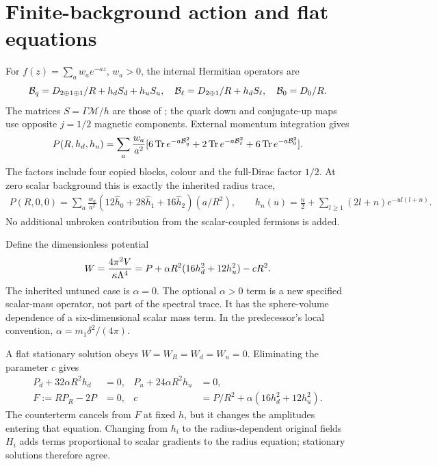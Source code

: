 \documentclass[11pt,letterpaper]{article}
\DeclareMathOperator{\Tr}{Tr}\DeclareMathOperator{\diag}{diag}
\begin{document}
\section{Finite-background action and flat equations}

For $f(z)=\sum_a w_a e^{-az}$, $w_a>0$, the internal Hermitian operators are
\begin{equation}
 \mathcal B_q=D_{2\oplus1\oplus1}/R+h_dS_d+h_uS_u,\quad
 \mathcal B_\ell=D_{2\oplus1}/R+h_dS_\ell,\quad \mathcal B_0=D_0/R.
\end{equation}
The matrices $S=\Gamma\mathcal M/h$ are those of \cite{exact}; the quark down and conjugate-up maps use opposite $j=1/2$ magnetic components. External momentum integration gives
\begin{equation}
 P(R,h_d,h_u)=\sum_a\frac{w_a}{a^2}
 [6\Tr e^{-a\B_q^2}+2\Tr e^{-a\B_\ell^2}+6\Tr e^{-a\B_0^2}].
 \label{eq:P}
\end{equation}
The factors include four copied blocks, colour and the full-Dirac factor $1/2$. At zero scalar background this is exactly the inherited radius trace,
\begin{gather}
 P(R,0,0)=\sum_a\frac{w_a}{a^2}(12\widehat h_0+28\widehat h_1+16\widehat h_2)(a/R^2),\qquad
 \widehat h_n(u)=\frac n2+\sum_{l\ge1}(2l+n)e^{-ul(l+n)}.
\end{gather}
No additional unbroken contribution from the scalar-coupled fermions is added.

Define the dimensionless potential
\begin{equation}
 W=\frac{4\pi^2V}{\kappa\Lambda^4}=P+\alpha R^2(16h_d^2+12h_u^2)-cR^2.
 \label{eq:W}
\end{equation}
The inherited untuned case is $\alpha=0$. The optional $\alpha>0$ term is a new specified scalar-mass operator, not part of the spectral trace. It has the sphere-volume dependence of a six-dimensional scalar mass term. In the predecessor's local convention, $\alpha=m_1\delta^2/(4\pi)$.

A flat stationary solution obeys $W=W_R=W_d=W_u=0$. Eliminating the parameter $c$ gives
\begin{align}
 P_d+32\alpha R^2h_d&=0,&P_u+24\alpha R^2h_u&=0,\\
 F:=RP_R-2P&=0,&c&=P/R^2+\alpha(16h_d^2+12h_u^2).
 \label{eq:flat}
\end{align}
The counterterm cancels from $F$ at fixed $h$, but it changes the amplitudes entering that equation. Changing from $h_i$ to the radius-dependent original fields $H_i$ adds terms proportional to scalar gradients to the radius equation; stationary solutions therefore agree.
\end{document}

